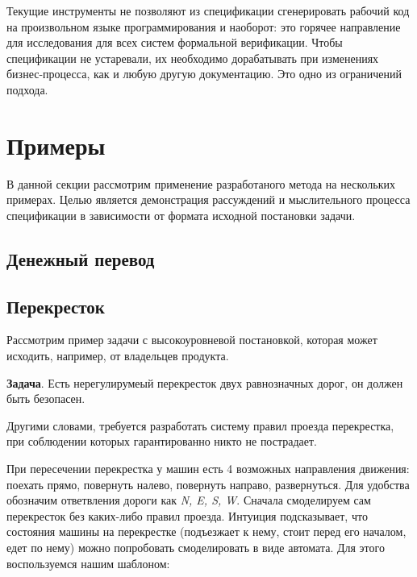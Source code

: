 \documentclass[14pt, openany]{book}
\begin{document}
Текущие инструменты не позволяют из спецификации сгенерировать рабочий код на произвольном языке программирования и наоборот: это горячее направление для исследования для всех систем формальной верификации. Чтобы спецификации не устаревали, их необходимо дорабатывать при изменениях бизнес-процесса, как и любую другую документацию. Это одно из ограничений подхода.

\section{Примеры}
В данной секции рассмотрим применение разработаного метода на нескольких примерах.
Целью является демонстрация рассуждений и мыслительного процесса спецификации в зависимости от формата исходной постановки задачи.

\subsection{Денежный перевод}

\subsection{Перекресток}
Рассмотрим пример задачи с высокоуровневой постановкой, которая может исходить, например, от владельцев продукта.

\textbf{Задача}. Есть нерегулирумеый перекресток двух равнозначных дорог, он должен быть безопасен.

Другими словами, требуется разработать систему правил проезда перекрестка, при соблюдении которых гарантированно никто не пострадает.

При пересечении перекрестка у машин есть 4 возможных направления движения: поехать прямо, повернуть налево, повернуть направо, развернуться. Для удобства обозначим ответвления дороги как \emph{N, E, S, W}. Сначала смоделируем сам перекресток без каких-либо правил проезда. Интуиция подсказывает, что состояния машины на перекрестке (подъезжает к нему, стоит перед его началом, едет по нему) можно попробовать смоделировать в виде автомата. Для этого воспользуемся нашим шаблоном:

\begin{ppcal}
\end{ppcal}
\end{document}
